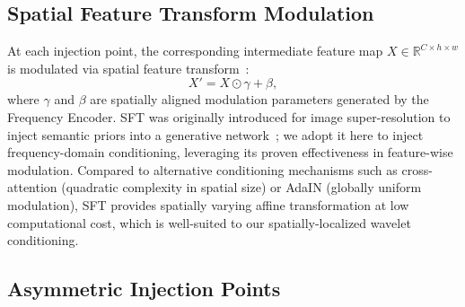 \subsection{Spatial Feature Transform Modulation}
\label{subsec:sft_modulation}

At each injection point, the corresponding intermediate feature map 
$X \in \mathbb{R}^{C \times h \times w}$ is modulated via spatial 
feature transform~\cite{wang2018sft}:
\begin{equation}
    X' = X \odot \gamma + \beta,
    \label{eq:sft_modulation}
\end{equation}
where $\gamma$ and $\beta$ are spatially aligned modulation 
parameters generated by the Frequency Encoder. SFT was originally 
introduced for image super-resolution to inject semantic priors 
into a generative network~\cite{wang2018sft}; we adopt it here to 
inject frequency-domain conditioning, leveraging its proven 
effectiveness in feature-wise modulation. Compared to alternative 
conditioning mechanisms such as cross-attention (quadratic 
complexity in spatial size) or AdaIN (globally uniform modulation), 
SFT provides spatially varying affine transformation at low 
computational cost, which is well-suited to our spatially-localized 
wavelet conditioning.

\subsection{Asymmetric Injection Points}
\label{subsec:injection_points}

